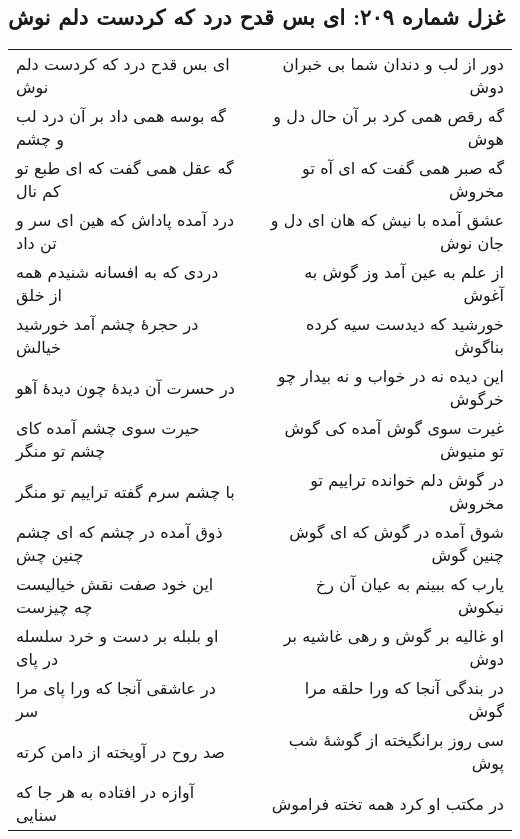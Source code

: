\begin{center}
\section*{غزل شماره ۲۰۹: ای بس قدح درد که کردست دلم نوش}
\label{sec:209}
\begin{longtable}{l p{0.5cm} r}
ای بس قدح درد که کردست دلم نوش
&&
دور از لب و دندان شما بی خبران دوش
\\
گه بوسه همی داد بر آن درد لب و چشم
&&
گه رقص همی کرد بر آن حال دل و هوش
\\
گه عقل همی گفت که ای طبع تو کم نال
&&
گه صبر همی گفت که ای آه تو مخروش
\\
درد آمده پاداش که هین ای سر و تن داد
&&
عشق آمده با نیش که هان ای دل و جان نوش
\\
دردی که به افسانه شنیدم همه از خلق
&&
از علم به عین آمد وز گوش به آغوش
\\
در حجرهٔ چشم آمد خورشید خیالش
&&
خورشید که دیدست سیه کرده بناگوش
\\
در حسرت آن دیدهٔ چون دیدهٔ آهو
&&
این دیده نه در خواب و نه بیدار چو خرگوش
\\
حیرت سوی چشم آمده کای چشم تو منگر
&&
غیرت سوی گوش آمده کی گوش تو منیوش
\\
با چشم سرم گفته تراییم تو منگر
&&
در گوش دلم خوانده تراییم تو مخروش
\\
ذوق آمده در چشم که ای چشم چنین چش
&&
شوق آمده در گوش که ای گوش چنین گوش
\\
این خود صفت نقش خیالیست چه چیزست
&&
یارب که ببینم به عیان آن رخ نیکوش
\\
او بلبله بر دست و خرد سلسله در پای
&&
او غالیه بر گوش و رهی غاشیه بر دوش
\\
در عاشقی آنجا که ورا پای مرا سر
&&
در بندگی آنجا که ورا حلقه مرا گوش
\\
صد روح در آویخته از دامن کرته
&&
سی روز برانگیخته از گوشهٔ شب پوش
\\
آوازه در افتاده به هر جا که سنایی
&&
در مکتب او کرد همه تخته فراموش
\\
\end{longtable}
\end{center}
